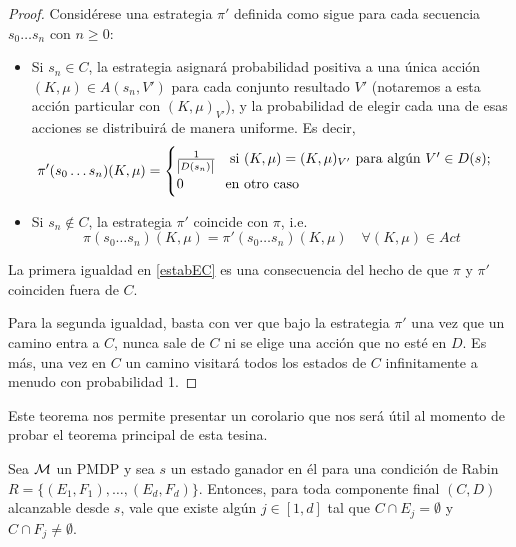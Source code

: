 \begin{proof}
	Considérese una estrategia $\pi'$ definida como sigue para cada secuencia $s_0 \dots s_n$ con $n \geq 0$:

	\begin{itemize}
		\item Si $s_n \in C$, la estrategia asignará probabilidad positiva a una única acción
		      $(K, \mu) \in A(s_n, V')$ para cada conjunto resultado $V'$ (notaremos a esta
		      acción particular con $(K, \mu)_{V'}$), y la probabilidad de elegir cada una de
		      esas acciones se distribuirá de manera uniforme. Es decir,
		      \[
			      \pi'(s_0 \dots s_n)(K, \mu) =
			      \begin{cases}
				      \frac{1}{\abs{D(s_n)}} \quad \text{si } (K, \mu) = (K, \mu)_{V'} \text{ para algún } V' \in D(s); \\
				      0 \qquad \quad \text{en otro caso}
			      \end{cases}
		      \]

		\item Si $s_n \notin C$, la estrategia $\pi'$ coincide con $\pi$, i.e.
		      \[
			      \pi(s_0 \dots s_n)(K, \mu) = \pi'(s_0\dots s_n)(K, \mu) \quad \forall (K, \mu) \in Act
		      \]

	\end{itemize}

	La primera igualdad en \ref{estabEC} es una consecuencia del hecho de que $\pi$
	y $\pi'$ coinciden fuera de $C$.

	Para la segunda igualdad, basta con ver que bajo la estrategia $\pi'$ una vez
	que un camino entra a $C$, nunca sale de $C$ ni se elige una acción que no esté
	en $D$. Es más, una vez en $C$ un camino visitará todos los estados de $C$
	infinitamente a menudo con probabilidad 1.
\end{proof}

Este teorema nos permite presentar un corolario que nos será útil al momento de
probar el teorema principal de esta tesina.

\begin{corollary}
	\label{adaptB30}
	Sea $\mathcal{M}$ un PMDP y sea $s$ un estado ganador en él para una condición de Rabin $R = \{(E_1, F_1), \dots, (E_d, F_d)\}$.%
	Entonces, para toda componente final $(C,D)$ alcanzable desde $s$, vale que existe algún $j \in [1, d]$ tal que $C \cap E_j= \emptyset$ y $C \cap F_j \neq \emptyset$.
\end{corollary}

